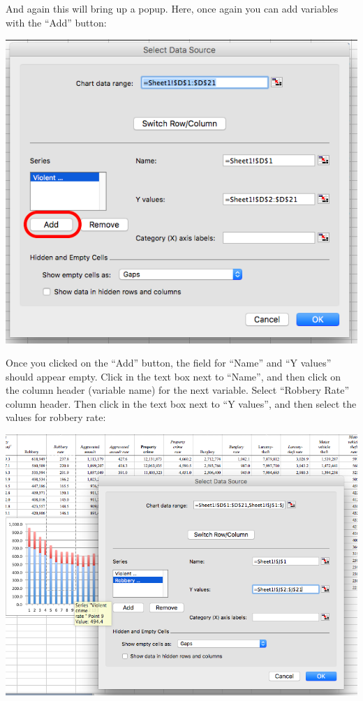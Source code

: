 \documentclass[]{book}
\theoremstyle{definition}
\theoremstyle{definition}
\theoremstyle{definition}
\theoremstyle{remark}
\begin{document}
And again this will bring up a popup. Here, once again you can add
variables with the ``Add'' button:

\includegraphics{imgs/stackedbar_4.png}

Once you clicked on the ``Add'' button, the field for ``Name'' and ``Y
values'' should appear empty. Click in the text box next to ``Name'',
and then click on the column header (variable name) for the next
variable. Select ``Robbery Rate'' column header. Then click in the text
box next to ``Y values'', and then select the values for robbery rate:

\includegraphics{imgs/stackedbar_5.png}
\end{document}
